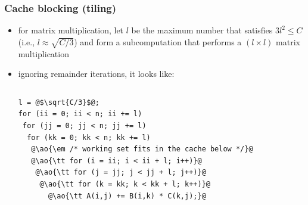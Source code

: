 \documentclass[12pt,dvipdfmx]{beamer}
\newcommand{\ao}[1]{{\color{blue}#1}}
\begin{document}
\begin{frame}[fragile]
\frametitle{Cache blocking (tiling)}

\begin{itemize}
\item for matrix multiplication, let $l$ be the maximum number
that satisfies $3l^2 \leq C$ (i.e., \ao{$l \approx \sqrt{C/3}$}) and form
a subcomputation that performs a $(l \times l)$ matrix multiplication

\item ignoring remainder iterations, it looks like:
\begin{columns}
\begin{column}{0.55\textwidth}
\begin{lstlisting}
l = @$\sqrt{C/3}$@;
for (ii = 0; ii < n; ii += l)
 for (jj = 0; jj < n; jj += l)
  for (kk = 0; kk < n; kk += l)
   @\ao{\em /* working set fits in the cache below */}@
   @\ao{\tt for (i = ii; i < ii + l; i++)}@
    @\ao{\tt for (j = jj; j < jj + l; j++)}@
     @\ao{\tt for (k = kk; k < kk + l; k++)}@
       @\ao{\tt A(i,j) += B(i,k) * C(k,j);}@
\end{lstlisting}
\end{column}
\begin{column}{0.45\textwidth}
\def\svgwidth{0.9\textwidth}
{\tiny}
\end{column}
\end{columns}
\end{itemize}
\end{frame}
\end{document}
